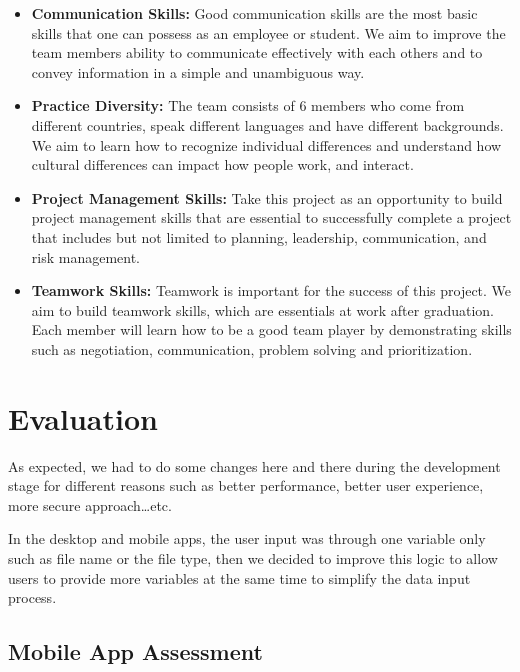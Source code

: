 \documentclass{article}
\begin{document}
\begin{itemize}
\item \textbf{Communication Skills:} Good communication skills are the most basic skills that one can possess as an employee or student. We aim to improve the team members ability to communicate effectively with each others and to convey information in a simple and unambiguous way.
\item \textbf{Practice Diversity:} The team consists of 6 members who come from different countries, speak different languages and have different backgrounds. We aim to learn how to recognize individual differences and understand how cultural differences can impact how people work, and interact.
\item \textbf{Project Management Skills:} Take this project as an opportunity to build project management skills that are essential to successfully complete a project that includes but not limited to planning, leadership, communication, and risk management.
\item \textbf{Teamwork Skills:} Teamwork is important for the success of this project. We aim to build teamwork skills, which are essentials at work after graduation. Each member will learn how to be a good team player by demonstrating skills such as negotiation, communication, problem solving and prioritization.
\end{itemize}

\section{Evaluation}
As expected, we had to do some changes here and there during the development stage for different reasons such as better performance, better user experience, more secure approach…etc.

In the desktop and mobile apps, the user input was through one variable only such as file name or the file type, then we decided to improve this logic to allow users to provide more variables at the same time to simplify the data input process.

\subsection{Mobile App Assessment}
\end{document}
